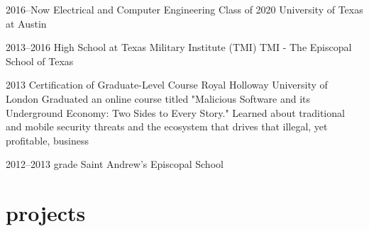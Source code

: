 \documentclass[]{friggeri-cv} %
\begin{document}
\begin{entrylist}

	\vspace{-10pt}
	\entry
	{2016--Now}
	{Electrical and Computer Engineering Class of 2020}
	{University of Texas at Austin}


	\vspace{-10pt}
	\entry
	{2013--2016}
	{High School at Texas Military Institute (TMI)}
	{TMI - The Episcopal School of Texas}


	\entry
	{2013}
	{Certification of Graduate-Level Course}
	{Royal Holloway University of London}
	{Graduated an online course titled "Malicious Software and its Underground Economy: Two Sides to Every Story." Learned about traditional and mobile security threats and the ecosystem that drives that illegal, yet profitable, business}


	\vspace{-10pt}
	\entry
	{2012--2013}
	{ grade}
	{Saint Andrew's Episcopal School}

\end{entrylist}


\section{projects}
\end{document}
